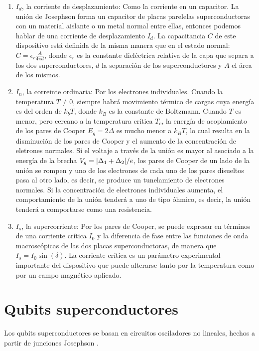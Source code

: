 \begin{enumerate}
    \item $I_d$, la corriente de desplazamiento: Como la corriente en un capacitor. La unión de Josephson forma un capacitor de placas parelelas superconductoras con un material aislante o un metal normal entre ellas, entonces podemos hablar de una corriente de desplazamiento $I_d$. La capacitancia $C$ de este dispositivo está definida de la misma manera que en el estado normal: $C = \epsilon_r \frac{A}{4 \pi d}$, donde $\epsilon_r$ es la constante dieléctrica relativa de la capa que separa a los dos superconductores, $d$ la separación de los superconductores y $A$ el área de los mismos.
    \item $I_n$, la correinte ordinaria: Por los electrones individuales. Cuando la temperatura $T \neq 0$, siempre habrá movimiento térmico de cargas cuya energía es del orden de $k_b T$, donde $k_B$ es la constante de Boltzmann. Cuando $T$ es menor, pero cercano a la temperatura crítica $T_c$, la energía de acoplamiento de los pares de Cooper $E_g = 2 \Delta$ es mucho menor a $k_B T$, lo cual resulta en la disminución de los pares de Cooper y el aumento de la concentración de eletrones normales. Si el voltaje a través de la unión es mayor al asociado a la energía de la brecha $V_g = \abs{\Delta_1 + \Delta_2}/e$, los pares de Cooper de un lado de la unión se rompen y uno de los electrones de cada uno de los pares disueltos pasa al otro lado, es decir, se produce un tunelamiento de electrones normales. Si la concentración de electrones individuales aumenta, el comportamiento de la unión tenderá a uno de tipo óhmico, es decir, la unión tenderá a comportarse como una resistencia.
    \item $I_s$, la supercorriente: Por los pares de Cooper, se puede expresar en términos de una corriente crítica $I_0$ y la diferencia de fase entre las funciones de onda macroscópicas de las dos placas superconductoras, de manera que $I_s = I_0 \sin(\delta)$. La corriente crítica es un parámetro experimental importante del dispositivo que puede alterarse tanto por la temperatura como por un campo magnético aplicado.
\end{enumerate}

\section{Qubits superconductores}
Los qubits superconductores se basan en circuitos osciladores no lineales, hechos a partir de junciones Josephson \cite{wendin}.

